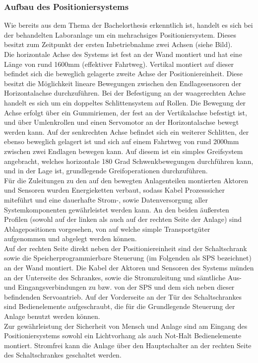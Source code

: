 \documentclass[../Bachelorarbeit.tex]{subfiles}
\begin{document}
\subsubsection{Aufbau des Positioniersystems}
Wie bereits aus dem Thema der Bachelorthesis erkenntlich ist, handelt es sich bei der behandelten Laboranlage um ein mehrachsiges Positioniersystem. Dieses besitzt zum Zeitpunkt der ersten Inbetriebnahme zwei Achsen (siehe Bild).\\
Die horizontale Achse des Systems ist fest an der Wand montiert und hat eine Länge von rund 1600mm (effektiver Fahrtweg). Vertikal montiert auf dieser befindet sich die beweglich gelagerte zweite Achse der Positioniereinheit. Diese besitzt die Möglichkeit lineare Bewegungen zwischen den Endlagesensoren der Horizontalachse durchzuführen. Bei der Befestigung an der waagerechten Achse handelt es sich um ein doppeltes Schlittensystem auf Rollen. Die Bewegung der Achse erfolgt über ein Gummiriemen, der fest an der Vertikalachse befestigt ist, und über Umlenkrollen und einen Servomotor an der Horizontalachse bewegt werden kann. Auf der senkrechten Achse befindet sich ein weiterer Schlitten, der ebenso beweglich gelagert ist und sich auf einem Fahrtweg von rund 2000mm zwischen zwei Endlagen bewegen kann. Auf diesem ist ein simples Greifsystem angebracht, welches horizontale 180 Grad Schwenkbewegungen durchführen kann, und in der Lage ist, grundlegende Greifoperationen durchzuführen.\\
Für die Zuleitungen zu den auf den bewegten Anlagenteilen montierten Aktoren und Sensoren wurden Energieketten verbaut, sodass Kabel Prozesssicher miteführt und eine dauerhafte Strom-, sowie Datenversorgung aller Systemkomponenten gewährleistet werden kann. An den beiden äußersten Profilen (sowohl auf der linken als auch auf der rechten Seite der Anlage) sind Ablagepositionen vorgesehen, von \bzw auf welche simple Transportgüter aufgenommen und abgelegt werden können.\\
Auf der rechten Seite direkt neben der Positioniereinheit sind der Schaltschrank sowie die Speicherprogrammierbare Steuerung (im Folgenden als SPS bezeichnet) an der Wand montiert. Die Kabel der Aktoren und Sensoren des Systems münden an der Unterseite des Schrankes, sowie die Stromzuleitung und sämtliche Aus- und Eingangsverbindungen zu bzw. von der SPS und dem sich neben dieser befindenden Servoantrieb. Auf der Vorderseite an der Tür des Schaltschrankes sind Bedienelemente aufgeschraubt, die für die Grundlegende Steuerung der Anlage benutzt werden können.\\
Zur gewährleistung der Sicherheit von Mensch und Anlage sind am Eingang des Positioniersystems sowohl ein Lichtvorhang als auch Not-Halt Bedienelemente montiert. Stromfrei kann die Anlage über den Hauptschalter an der rechten Seite des Schaltschrankes geschaltet werden.
\end{document}
